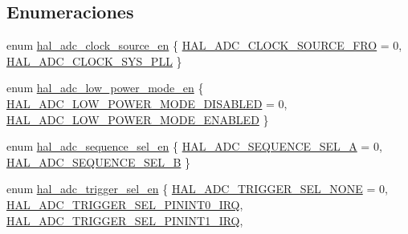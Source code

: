 \subsection*{Enumeraciones}
\begin{DoxyCompactItemize}
\item 
enum \hyperlink{group__ADC_gaee7bd99d368af2a425a9954a9e811a51}{hal\+\_\+adc\+\_\+clock\+\_\+source\+\_\+en} \{ \hyperlink{group__ADC_ggaee7bd99d368af2a425a9954a9e811a51a75a03c616d0b74267642f2b860b19a4c}{H\+A\+L\+\_\+\+A\+D\+C\+\_\+\+C\+L\+O\+C\+K\+\_\+\+S\+O\+U\+R\+C\+E\+\_\+\+F\+RO} = 0, 
\hyperlink{group__ADC_ggaee7bd99d368af2a425a9954a9e811a51ad8be01dc9a2af6e29ab24f823fc40560}{H\+A\+L\+\_\+\+A\+D\+C\+\_\+\+C\+L\+O\+C\+K\+\_\+\+S\+Y\+S\+\_\+\+P\+LL}
 \}
\item 
enum \hyperlink{group__ADC_gaf1570443ca3570a7ae83b90307bbecca}{hal\+\_\+adc\+\_\+low\+\_\+power\+\_\+mode\+\_\+en} \{ \hyperlink{group__ADC_ggaf1570443ca3570a7ae83b90307bbeccaaf92172fb70ce285c23631cb025b3cd52}{H\+A\+L\+\_\+\+A\+D\+C\+\_\+\+L\+O\+W\+\_\+\+P\+O\+W\+E\+R\+\_\+\+M\+O\+D\+E\+\_\+\+D\+I\+S\+A\+B\+L\+ED} = 0, 
\hyperlink{group__ADC_ggaf1570443ca3570a7ae83b90307bbeccaaf3c25521b4c61b46bfe7771db9370769}{H\+A\+L\+\_\+\+A\+D\+C\+\_\+\+L\+O\+W\+\_\+\+P\+O\+W\+E\+R\+\_\+\+M\+O\+D\+E\+\_\+\+E\+N\+A\+B\+L\+ED}
 \}
\item 
enum \hyperlink{group__ADC_ga9297d7b14d7018a94bce94f0103d8559}{hal\+\_\+adc\+\_\+sequence\+\_\+sel\+\_\+en} \{ \hyperlink{group__ADC_gga9297d7b14d7018a94bce94f0103d8559aa8ec9c3fb5a00f2169651f2b1f63df0f}{H\+A\+L\+\_\+\+A\+D\+C\+\_\+\+S\+E\+Q\+U\+E\+N\+C\+E\+\_\+\+S\+E\+L\+\_\+A} = 0, 
\hyperlink{group__ADC_gga9297d7b14d7018a94bce94f0103d8559a109de2c585363efee84dbfb7eee7a1c5}{H\+A\+L\+\_\+\+A\+D\+C\+\_\+\+S\+E\+Q\+U\+E\+N\+C\+E\+\_\+\+S\+E\+L\+\_\+B}
 \}
\item 
enum \hyperlink{group__ADC_ga67fe859b54301579f1b1daef874514ca}{hal\+\_\+adc\+\_\+trigger\+\_\+sel\+\_\+en} \{ \newline
\hyperlink{group__ADC_gga67fe859b54301579f1b1daef874514caaaf722f012bd0aa063b595333f9012a20}{H\+A\+L\+\_\+\+A\+D\+C\+\_\+\+T\+R\+I\+G\+G\+E\+R\+\_\+\+S\+E\+L\+\_\+\+N\+O\+NE} = 0, 
\hyperlink{group__ADC_gga67fe859b54301579f1b1daef874514caa2b6bc8f45ca02b89db9d0b827078a8ac}{H\+A\+L\+\_\+\+A\+D\+C\+\_\+\+T\+R\+I\+G\+G\+E\+R\+\_\+\+S\+E\+L\+\_\+\+P\+I\+N\+I\+N\+T0\+\_\+\+I\+RQ}, 
\hyperlink{group__ADC_gga67fe859b54301579f1b1daef874514caa81102caf42db5f4d5f7b958fe7d9ae6d}{H\+A\+L\+\_\+\+A\+D\+C\+\_\+\+T\+R\+I\+G\+G\+E\+R\+\_\+\+S\+E\+L\+\_\+\+P\+I\+N\+I\+N\+T1\+\_\+\+I\+RQ}, 

\end{DoxyCompactItemize}
